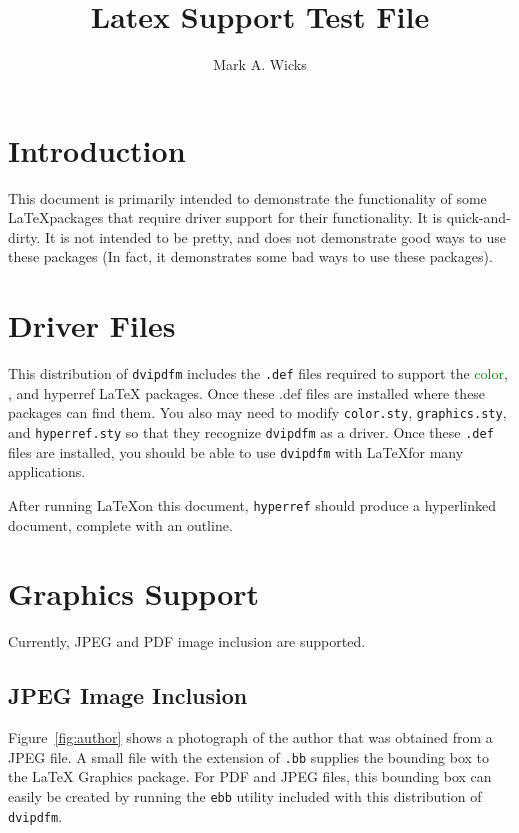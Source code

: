\documentclass{article}
\title{\color{blue}Latex Support Test File}
\author{\color{green}Mark A. Wicks}
\begin{document}
\maketitle
\section{Introduction}
This document is primarily intended
to demonstrate the functionality
of some \LaTeX packages that require
driver support for their functionality.
It is quick-and-dirty.
It is not intended to be pretty, and
does not demonstrate good ways to use these packages
(In fact, it demonstrates some bad ways to use these packages).

\section{Driver Files}
This distribution of {\tt dvipdfm} includes
the {\tt .def} files required to support
the \textcolor{green}{color},
, and hyperref \LaTeX\space
packages.  Once these .def files
are installed where these packages
can find them.  You also may need
to modify {\tt color.sty}, {\tt graphics.sty},
and {\tt hyperref.sty} so that they
recognize {\tt dvipdfm} as a driver.
Once these {\tt .def} files are installed,
you should be able to use {\tt dvipdfm}
with \LaTeX for many applications.

After running \LaTeX on this
document, {\tt hyperref}
should produce a hyperlinked
document, complete with an outline.

\newpage
\section{Graphics Support}
Currently, JPEG and PDF image
inclusion are supported.

\subsection{JPEG Image Inclusion}
Figure~\ref{fig:author}
shows a photograph of the author
that was obtained from a JPEG file.
A small file with the extension of {\tt .bb}
supplies the bounding box to the \LaTeX\space
Graphics package.  For PDF and JPEG files,
this bounding box can easily be created by running
the {\tt ebb} utility included with this
distribution of {\tt dvipdfm}.
\end{document}
